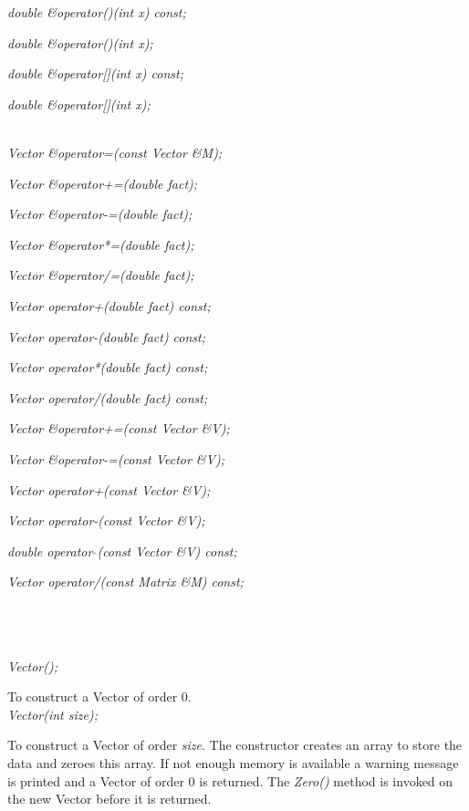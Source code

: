 {\em double \&operator()(int x) const;} 

{\em double \&operator()(int x);} 

{\em double \&operator[](int x) const;} 

{\em double \&operator[](int x);} 

\\ 
{\em Vector \&operator=(const Vector \&M);}

{\em  Vector \&operator+=(double fact);} 

{\em Vector \&operator-=(double fact);} 

{\em Vector \&operator*=(double fact);} 

{\em Vector \&operator/=(double fact); } 

{\em Vector operator+(double fact) const;} 

{\em Vector operator-(double fact) const;} 

{\em  Vector operator*(double fact) const;} 

{\em  Vector operator/(double fact) const;} 

{\em  Vector \&operator+=(const Vector \&V);} 

{\em  Vector \&operator-=(const Vector \&V);} 

{\em  Vector operator+(const Vector \&V);} 

{\em  Vector operator-(const Vector \&V);} 

{\em  double operator { }$\hat{ }$(const Vector \&V) const;   } 

{\em Vector operator/(const Matrix \&M) const; } 

 \\ 
 \\ 


  \\
{\em Vector();}  

To construct a Vector of order $0$. \\

{\em  Vector(int size);}  

To construct a Vector of order {\em size}. The constructor creates an
array to store the data and zeroes this array. If not enough memory is
available a warning message is printed and a Vector of order $0$ is 
returned. The {\em Zero()}  method is invoked on the new Vector before
it is returned.\\ 

